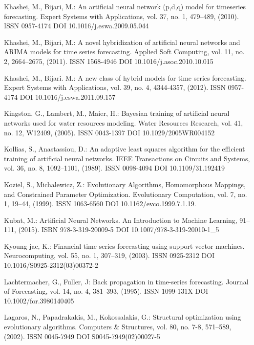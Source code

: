 \begin{thebibliography}{99.}
 Khashei, M., Bijari, M.: An artificial neural network (p,d,q) model for timeseries forecasting. Expert Systems with Applications, vol. 37, no. 1, 479--489, (2010). ISSN 0957-4174 DOI 10.1016/j.eswa.2009.05.044

 Khashei, M., Bijari, M.: A novel hybridization of artificial neural networks and ARIMA models for time series forecasting. Applied Soft Computing, vol. 11, no. 2, 2664--2675, (2011). ISSN 1568-4946 DOI 10.1016/j.asoc.2010.10.015

 Khashei, M., Bijari. M.: A new class of hybrid models for time series forecasting. Expert Systems with Applications, vol. 39, no. 4, 4344-4357, (2012). ISSN 0957-4174 DOI 10.1016/j.eswa.2011.09.157

 Kingston, G., Lambert, M., Maier, H.: Bayesian training of artificial neural networks used for water resources modeling. Water Resources Research, vol. 41, no. 12, W12409, (2005). ISSN 0043-1397 DOI 10.1029/2005WR004152

 Kollias, S., Anastassiou, D.: An adaptive least squares algorithm for the efficient training of artificial neural networks. IEEE Transactions on Circuits and Systems, vol. 36, no. 8, 1092--1101, (1989). ISSN 0098-4094 DOI 10.1109/31.192419

 Koziel, S., Michalewicz, Z.: Evolutionary Algorithms, Homomorphous Mappings, and Constrained Parameter Optimization. Evolutionary Computation, vol. 7, no. 1, 19--44, (1999). ISSN 1063-6560 DOI 10.1162/evco.1999.7.1.19.

 Kubat, M.: Artificial Neural Networks. An Introduction to Machine Learning, 91--111, (2015). ISBN 978-3-319-20009-5 DOI 10.1007/978-3-319-20010-1\_5

 Kyoung-jae, K.: Financial time series forecasting using support vector machines. Neurocomputing, vol. 55, no. 1, 307--319, (2003). ISSN 0925-2312 DOI 10.1016/S0925-2312(03)00372-2

 Lachtermacher, G., Fuller, J: Back propagation in time-series forecasting. Journal of Forecasting, vol. 14, no. 4, 381--393, (1995). ISSN 1099-131X DOI 10.1002/for.3980140405

 Lagaros, N., Papadrakakis, M., Kokossalakis, G.: Structural optimization using evolutionary algorithms. Computers \& Structures, vol. 80, no. 7-8, 571--589, (2002). ISSN 0045-7949 DOI S0045-7949(02)00027-5


\end{thebibliography}
